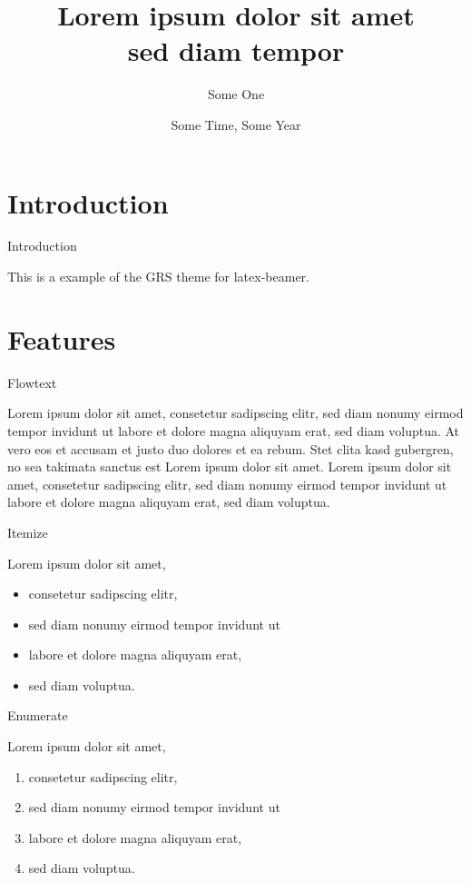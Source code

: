 \documentclass[t,english]{beamer}
\title[Lorem ipsum dolor sit amet]{Lorem ipsum dolor sit amet \\sed diam tempor}
\author{Some One}
\date{Some Time, Some Year}
\begin{document}
\maketitle


\section{Introduction}

\begin{frame}[c]{Introduction}

This is a example of the GRS theme for latex-beamer.

\end{frame}

\section{Features}

\begin{frame}{Flowtext}

Lorem ipsum dolor sit amet, consetetur sadipscing elitr, sed diam nonumy eirmod
tempor invidunt ut labore et dolore magna aliquyam erat, sed diam voluptua. At
vero eos et accusam et justo duo dolores et ea rebum. Stet clita kasd
gubergren, no sea takimata sanctus est Lorem ipsum dolor sit amet. Lorem ipsum
dolor sit amet, consetetur sadipscing elitr, sed diam nonumy eirmod tempor
invidunt ut labore et dolore magna aliquyam erat, sed diam voluptua.

\end{frame}

\begin{frame}{Itemize}

Lorem ipsum dolor sit amet, 

\begin{itemize}
  \item consetetur sadipscing elitr, 
  \item sed diam nonumy eirmod tempor invidunt ut 
  \item labore et dolore magna aliquyam erat, 
  \item sed diam voluptua.
\end{itemize}

\end{frame}

\begin{frame}{Enumerate}

Lorem ipsum dolor sit amet, 

\begin{enumerate}
  \item consetetur sadipscing elitr, 
  \item sed diam nonumy eirmod tempor invidunt ut 
  \item labore et dolore magna aliquyam erat, 
  \item sed diam voluptua.
\end{enumerate}

\end{frame}
\end{document}

